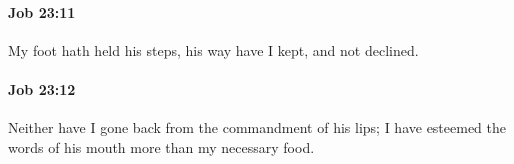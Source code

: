 		\paragraph{Job 23:11} %
			\label{JOB-23-11}

			My foot hath held his steps, his way have I kept, and not declined.


		\paragraph{Job 23:12} %
			\label{JOB-23-12}

			Neither have I gone back from the commandment of his lips; I have esteemed the words of his mouth more than my necessary food.


